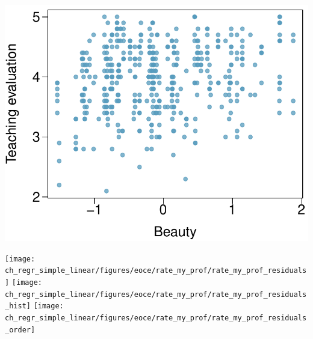 {\begin{minipage}[c]{0.07\textwidth}
$\:$ \\
\end{minipage}
\begin{minipage}[c]{0.45\textwidth}
\includegraphics[width=\textwidth]{ch_regr_simple_linear/figures/eoce/rate_my_prof/rate_my_prof_eval_beauty.pdf} \\
\end{minipage}
\begin{center}
\texttt{[image: ch\_regr\_simple\_linear/figures/eoce/rate\_my\_prof/rate\_my\_prof\_residuals]}
\texttt{[image: ch\_regr\_simple\_linear/figures/eoce/rate\_my\_prof/rate\_my\_prof\_residuals\_hist]}
\texttt{[image: ch\_regr\_simple\_linear/figures/eoce/rate\_my\_prof/rate\_my\_prof\_residuals\_order]}
\end{center}
}{}
